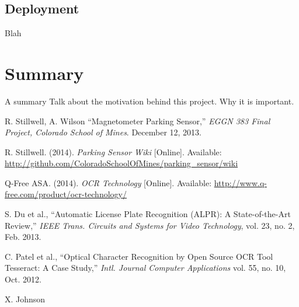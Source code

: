 \documentclass[11pt, oneside, fullpage, doublespace]{article}
\begin{document}
\subsection{Deployment}
Blah


\section{Summary}
A summary \cite{johnson2012} Talk about the motivation behind this project. Why it is important.


\begin{thebibliography}{99}
 R. Stillwell, A. Wilson ``Magnetometer Parking Sensor,'' \emph{EGGN 383 Final Project, Colorado School of Mines}. December 12, 2013.

 R. Stillwell. (2014). \emph{Parking Sensor Wiki} [Online]. Available: \url{http://github.com/ColoradoSchoolOfMines/parking_sensor/wiki}

 Q-Free ASA. (2014). \emph{OCR Technology} [Online]. Available: \url{http://www.q-free.com/product/ocr-technology/}

 S. Du et al., ``Automatic License Plate Recognition (ALPR): A State-of-the-Art Review,'' \emph{IEEE Trans. Circuits and Systems for Video Technology}, vol. 23, no. 2, Feb. 2013.

 C. Patel et al., ``Optical Character Recognition by Open Source OCR Tool Tesseract: A Case Study,'' \emph{Intl. Journal Computer Applications} vol. 55, no. 10, Oct. 2012.

 X. Johnson
\end{thebibliography}
\end{document}
